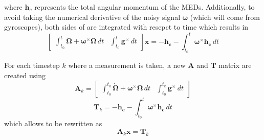 where $\bm{h}_c$ represents the total angular momentum of the MEDs. Additionally, to avoid taking the numerical derivative of the noisy signal $\bm{\omega}$ (which will come from gyroscopes), both sides of  are integrated with resepct to time which results in 
\begin{equation}\label{equation:LSM_no_k}
    \begin{bmatrix}
    \int_{t_0}^{t}\dot{\bm{\Omega}}+\bm{\omega}^{\times}\bm{\Omega}\,dt & \int_{t_0}^{t}\bm{g}^{\times}\,dt
    \end{bmatrix}\bm{x}
    =-{\bm{h_c}} - \int_{t_0}^{t}\bm{\omega}^{\times}\bm{h_c}\,dt
\end{equation}

For each timestep $k$ where a measurement is taken, a new $\bm{A}$ and $\bm{T}$ matrix are created using
\begin{equation}
    \bm{A}_k=\begin{bmatrix}
    \int_{t_0}^{t_k}\dot{\bm{\Omega}}+\bm{\omega}^{\times}\bm{\Omega}\,dt & \int_{t_0}^{t_k}\bm{g}^{\times}\,dt
    \end{bmatrix}
\end{equation}
\begin{equation}
    \bm{T}_k=-{\bm{h_c}} - \int_{t_0}^{t}\bm{\omega}^{\times}\bm{h_c}\,dt
\end{equation}
which allows  to be rewritten as 
\begin{equation}\label{equation:LSM_with_k}
    \bm{A}_k\bm{x}=\bm{T}_k
\end{equation}

